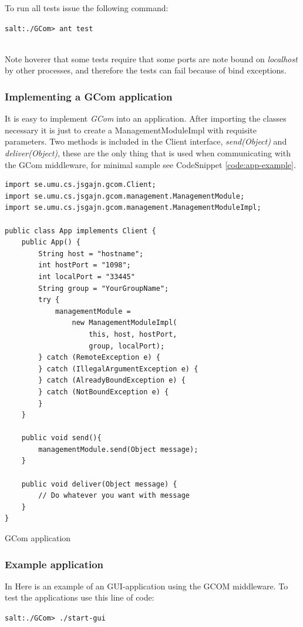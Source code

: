 \documentclass[titlepage, twocolumn, a4paper, 10pt]{article}
\begin{document}
To run all tests issue the following command:\\
\begin{footnotesize}
  \verb!salt:./GCom> ant test!
\end{footnotesize}\\
Note hoverer that some tests require that some ports are note bound on
\textit{localhost} by other processes, and therefore the tests can
fail because of bind exceptions.

\subsubsection{Implementing a GCom application}\label{sec:implgcom}
It is easy to implement \textit{GCom} into an application. After
importing the classes necessary it is just to create a
ManagementModuleImpl with requisite parameters. Two methods is
included in the Client interface, \textit{send(Object)} and
\textit{deliver(Object)}, these are the only thing that is used when
communicating with the GCom middleware, for minimal sample see
CodeSnippet \ref{code:app-example}.
\begin{code}
  \begin{footnotesize}
\begin{verbatim}
import se.umu.cs.jsgajn.gcom.Client;
import se.umu.cs.jsgajn.gcom.management.ManagementModule;
import se.umu.cs.jsgajn.gcom.management.ManagementModuleImpl;

public class App implements Client {
    public App() {
        String host = "hostname";
        int hostPort = "1098";
        int localPort = "33445"
        String group = "YourGroupName";
        try {
            managementModule =
                new ManagementModuleImpl(
                    this, host, hostPort,
                    group, localPort);
        } catch (RemoteException e) {
        } catch (IllegalArgumentException e) {
        } catch (AlreadyBoundException e) {
        } catch (NotBoundException e) {
        }
    }

    public void send(){
        managementModule.send(Object message);
    }

    public void deliver(Object message) {
        // Do whatever you want with message
    }
}
\end{verbatim}
  \end{footnotesize}
  \caption{GCom application}
  \label{code:app-example}
\end{code}


\subsubsection{Example application}\label{sec:exapp}
In Here is an example of an GUI-application using the GCOM 
middleware. To test the applications use this line of code:
\\
\begin{footnotesize}
  \verb!salt:./GCom> ./start-gui!
\end{footnotesize}\\
\end{document}
